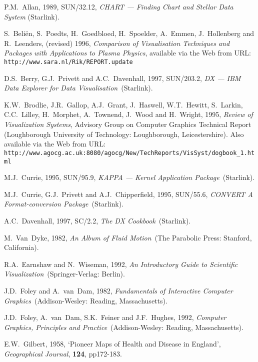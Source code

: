 \begin{thebibliography}{99}

   P.M.~Allan, 1989, SUN/32.12, {\it CHART --- Finding
   Chart and Stellar Data System} (Starlink).

   S.~Beli\"{e}n, S.~Poedts, H.~Goedbloed, H.~Spoelder,
   A.~Emmen, J.~Hollenberg and R.~Leenders, (revised) 1996,
   {\it Comparison of Visualisation Techniques and Packages with 
   Applications to Plasma Physics}, available via the Web from URL:
   {\tt http://www.sara.nl/Rik/REPORT.update}

   D.S.~Berry, G.J.~Privett and A.C.~Davenhall, 1997,
   SUN/203.2, {\it DX --- IBM Data Explorer for Data Visualisation}\,
   (Starlink).

   K.W.~Brodlie, J.R.~Gallop, A.J.~Grant, J.~Haswell,
   W.T.~Hewitt, S.~Larkin, C.C.~Lilley, H.~Morphet, A.~Townend, 
   J.~Wood and H.~Wright, 1995, {\it Review of Visualization Systems},
   Advisory Group on Computer Graphics Technical Report (Loughborough
   University of Technology: Loughborough, Leicestershire). Also
   available via the Web from URL: {\tt
   http://www.agocg.ac.uk:8080/agocg/New/TechReports/VisSyst/dogbook\_1.html}

   M.J.~Currie, 1995, SUN/95.9, {\it KAPPA --- Kernel
   Application Package}\, (Starlink).

   M.J.~Currie, G.J.~Privett and A.J.~Chipperfield,
   1995, SUN/55.6, {\it CONVERT A Format-conversion Package}\, (Starlink).

   A.C.~Davenhall, 1997, SC/2.2, {\it The DX Cookbook}\,
   (Starlink).

   M.~Van~Dyke, 1982, {\it An Album of Fluid Motion}\,
   (The Parabolic Press: Stanford, California).

   R.A.~Earnshaw and N.~Wiseman, 1992, {\it An
   Introductory Guide to Scientific Visualization}\,
   (Springer-Verlag: Berlin).

   J.D.~Foley and A.~van~Dam, 1982, {\it Fundamentals
   of Interactive Computer Graphics}\, (Addison-Wesley: Reading,
   Massachusetts).

   J.D.~Foley, A.~van~Dam, S.K.~Feiner and J.F.~Hughes,
   1992, {\it Computer Graphics, Principles and Practice}\,
   (Addison-Wesley: Reading, Massachusetts).

   E.W.~Gilbert, 1958, `Pioneer Maps of Health and
   Disease in England', {\it Geographical Journal}, {\bf 124},
   pp172-183.


\end{thebibliography}
